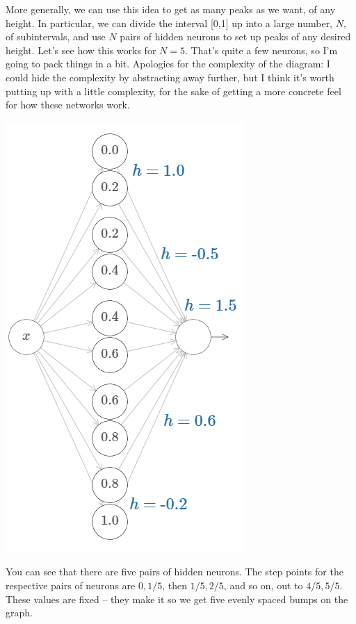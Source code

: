 \documentclass[a4paper,twoside,10pt]{book}
\begin{document}
More generally, we can use this idea to get as many peaks as we want, of any height. In particular, we can divide the interval [0,1] up into a large number, $N$, of subintervals, and use $N$ pairs of hidden neurons to set up peaks of any desired height. Let's see how this works for $N=5$. That's quite a few neurons, so I'm going to pack things in a bit. Apologies for the complexity of the diagram: I could hide the complexity by abstracting away further, but I think it's worth putting up with a little complexity, for the sake of getting a more concrete feel for how these networks work.
\begin{center}
\includegraphics[height=0.65\linewidth]{./figures/ch4/tikz438}
\end{center}
You can see that there are five pairs of hidden neurons. The step points for the respective pairs of neurons are $0,1/5$, then $1/5,2/5$, and so on, out to $4/5,5/5$. These values are fixed -- they make it so we get five evenly spaced bumps on the graph.
\end{document}
